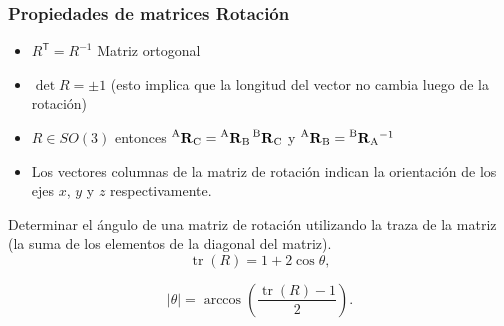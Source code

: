 \begin{frame}
    \frametitle{Propiedades de matrices Rotación}
    \small
    \begin{itemize}
        \item $R^{\mathsf {T}}=R^{-1}$ Matriz ortogonal
        \item $\det R = \pm 1$ (esto implica que la longitud del vector no cambia luego de la rotación)
        \item $R \in SO(3)$ entonces $\prescript{\mathrm{A}}{}{{\boldsymbol{\mathbf{R}}}_\mathrm{C}} = \prescript{\mathrm{A}}{}{{\boldsymbol{\mathbf{R}}}_\mathrm{B}} \prescript{\mathrm{B}}{}{{\boldsymbol{\mathbf{R}}}_\mathrm{C}}$ y $\prescript{\mathrm{A}}{}{{\boldsymbol{\mathbf{R}}}_\mathrm{B}} = \prescript{\mathrm{B}}{}{{\boldsymbol{\mathbf{R}}}_\mathrm{A}}^{-1}$
        \item Los vectores columnas de la matriz de rotación indican la orientación de los ejes $x$, $y$ y $z$ respectivamente.
    \end{itemize}

    Determinar el ángulo de una matriz de rotación utilizando la traza de la matriz (la suma de los elementos de la diagonal del matriz).
    \begin{equation*}
        {\displaystyle \operatorname {tr} (R)=1+2\cos \theta ,}
    \end{equation*}

    \begin{equation*}
        {\displaystyle |\theta |=\arccos \left({\frac {\operatorname {tr} (R)-1}{2}}\right).}
    \end{equation*}

\end{frame}


